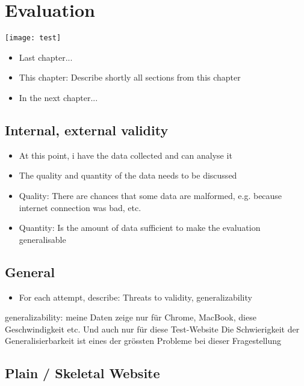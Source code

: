\chapter{Evaluation}


\texttt{[image: test]}


\begin{itemize}
	\item Last chapter...
	\item This chapter: Describe shortly all sections from this chapter
	\item In the next chapter...
\end{itemize}




\section{Internal, external validity}


\begin{itemize}
\item At this point, i have the data collected and can analyse it
\item The quality and quantity of the data needs to be discussed
\item Quality: There are chances that some data are malformed, e.g. because internet connection was bad, etc.
\item Quantity: Is the amount of data sufficient to make the evaluation generalisable
\end{itemize}




\section{General}

\begin{itemize}
    \item For each attempt, describe: Threats to validity, generalizability
\end{itemize}

generalizability: meine Daten zeige nur für Chrome, MacBook, diese Geschwindigkeit etc.
Und auch nur für diese Test-Website
Die Schwierigkeit der Generalisierbarkeit ist eines der grössten Probleme bei dieser Fragestellung

\section{Plain / Skeletal Website}

